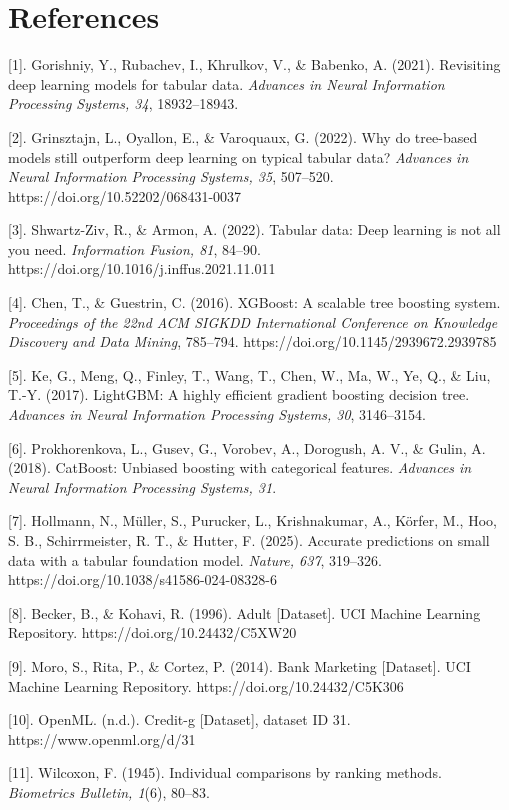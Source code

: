 \section{References}\label{references}

{[}1{]}. Gorishniy, Y., Rubachev, I., Khrulkov, V., \& Babenko, A. (2021). Revisiting deep learning models for tabular data. \emph{Advances in Neural Information Processing Systems, 34}, 18932--18943.

{[}2{]}. Grinsztajn, L., Oyallon, E., \& Varoquaux, G. (2022). Why do tree-based models still outperform deep learning on typical tabular data? \emph{Advances in Neural Information Processing Systems, 35}, 507--520. https://doi.org/10.52202/068431-0037

{[}3{]}. Shwartz-Ziv, R., \& Armon, A. (2022). Tabular data: Deep learning is not all you need. \emph{Information Fusion, 81}, 84--90. https://doi.org/10.1016/j.inffus.2021.11.011

{[}4{]}. Chen, T., \& Guestrin, C. (2016). XGBoost: A scalable tree boosting system. \emph{Proceedings of the 22nd ACM SIGKDD International Conference on Knowledge Discovery and Data Mining}, 785--794. https://doi.org/10.1145/2939672.2939785

{[}5{]}. Ke, G., Meng, Q., Finley, T., Wang, T., Chen, W., Ma, W., Ye, Q., \& Liu, T.-Y. (2017). LightGBM: A highly efficient gradient boosting decision tree. \emph{Advances in Neural Information Processing Systems, 30}, 3146--3154.

{[}6{]}. Prokhorenkova, L., Gusev, G., Vorobev, A., Dorogush, A. V., \& Gulin, A. (2018). CatBoost: Unbiased boosting with categorical features. \emph{Advances in Neural Information Processing Systems, 31}.

{[}7{]}. Hollmann, N., Müller, S., Purucker, L., Krishnakumar, A., Körfer, M., Hoo, S. B., Schirrmeister, R. T., \& Hutter, F. (2025). Accurate predictions on small data with a tabular foundation model. \emph{Nature, 637}, 319--326. https://doi.org/10.1038/s41586-024-08328-6

{[}8{]}. Becker, B., \& Kohavi, R. (1996). Adult {[}Dataset{]}. UCI Machine Learning Repository. https://doi.org/10.24432/C5XW20

{[}9{]}. Moro, S., Rita, P., \& Cortez, P. (2014). Bank Marketing {[}Dataset{]}. UCI Machine Learning Repository. https://doi.org/10.24432/C5K306

{[}10{]}. OpenML. (n.d.). Credit-g {[}Dataset{]}, dataset ID 31. https://www.openml.org/d/31

{[}11{]}. Wilcoxon, F. (1945). Individual comparisons by ranking methods. \emph{Biometrics Bulletin, 1}(6), 80--83.
